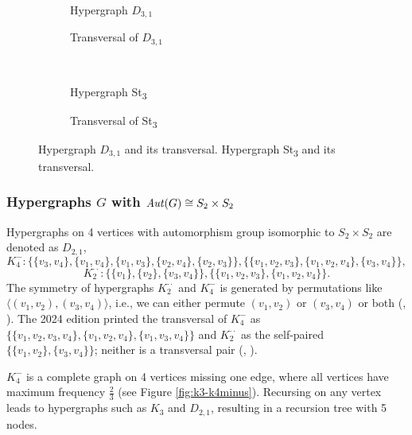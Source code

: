 \begin{figure}[tp]
\centering
\begin{subfigure}{0.45\linewidth}\centering\caption{Hypergraph $D_{3,1}$}\end{subfigure}\hfill
\begin{subfigure}{0.45\linewidth}\centering\caption{Transversal of $D_{3,1}$}\end{subfigure}\\[8pt]
\begin{subfigure}{0.45\linewidth}\centering\caption{Hypergraph St\textsubscript{3}}\end{subfigure}\hfill
\begin{subfigure}{0.45\linewidth}\centering\caption{Transversal of St\textsubscript{3}}\end{subfigure}
\caption{Hypergraph $D_{3,1}$ and its transversal. Hypergraph St\textsubscript{3} and its transversal.}\label{fig:d31-st3}
\end{figure}

\subsubsection*{Hypergraphs $G$ with $\mathit{Aut}(G)\cong S_2\times S_2$}

Hypergraphs on 4 vertices with automorphism group isomorphic to $S_2\times S_2$ are denoted as $D_{2,1}$,
\[
K_4^-:\{\{v_3,v_4\},\{v_1,v_4\},\{v_1,v_3\},\{v_2,v_4\},\{v_2,v_3\}\},\{\{v_1,v_2,v_3\},\{v_1,v_2,v_4\},\{v_3,v_4\}\},
\]
\[
K_2^{\cdot\cdot}:\{\{v_1\},\{v_2\},\{v_3,v_4\}\},\{\{v_1,v_2,v_3\},\{v_1,v_2,v_4\}\}.
\]
The symmetry of hypergraphs $K_2^{\cdot\cdot}$ and $K_4^-$ is generated by permutations like $\langle(v_1,v_2),(v_3,v_4)\rangle$, i.e., we can either permute $(v_1,v_2)$ or $(v_3,v_4)$ or both (, ). The 2024 edition printed the transversal of $K_4^-$ as $\{\{v_1,v_2,v_3,v_4\},\{v_1,v_2,v_4\},\{v_1,v_3,v_4\}\}$ and $K_2^{\cdot\cdot}$ as the self-paired $\{\{v_1,v_2\},\{v_3,v_4\}\}$; neither is a transversal pair (, ).

$K_4^-$ is a complete graph on 4 vertices missing one edge, where all vertices have maximum frequency $\frac{2}{3}$ (see Figure \ref{fig:k3-k4minus}). Recursing on any vertex leads to hypergraphs such as $K_3$ and $D_{2,1}$, resulting in a recursion tree with 5 nodes.

